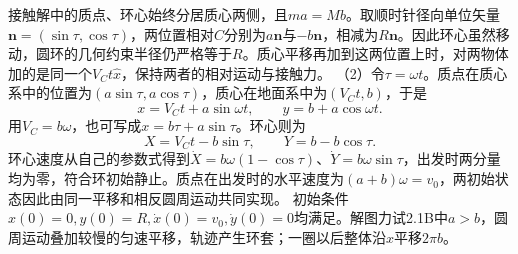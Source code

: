 \documentclass[UTF8,fontset=fandol,a4paper,11pt]{ctexart}
\begin{document}
接触解中的质点、环心始终分居质心两侧，且$ma=Mb$。取顺时针径向单位矢量$\boldsymbol n=(\sin\tau,\cos\tau)$，两位置相对$C$分别为$a\boldsymbol n$与$-b\boldsymbol n$，相减为$R\boldsymbol n$。因此环心虽然移动，圆环的几何约束半径仍严格等于$R$。质心平移再加到这两位置上时，对两物体加的是同一个$V_Ct\hat x$，保持两者的相对运动与接触力。
（2）令$\tau=\omega t$。质点在质心系中的位置为$(a\sin\tau,a\cos\tau)$，质心在地面系中为$(V_Ct,b)$，于是
\[
\boxed{x=V_Ct+a\sin\omega t,\qquad
y=b+a\cos\omega t}.
\]
用$V_C=b\omega$，也可写成$x=b\tau+a\sin\tau$。环心则为
\[
X=V_Ct-b\sin\tau,\qquad Y=b-b\cos\tau.
\]
环心速度从自己的参数式得到$\dot X=b\omega(1-\cos\tau)$、$\dot Y=b\omega\sin\tau$，出发时两分量均为零，符合环初始静止。质点在出发时的水平速度为$(a+b)\omega=v_0$，两初始状态因此由同一平移和相反圆周运动共同实现。
初始条件$x(0)=0,y(0)=R,\dot x(0)=v_0,\dot y(0)=0$均满足。解图力试2.1B中$a>b$，圆周运动叠加较慢的匀速平移，轨迹产生环套；一圈以后整体沿$x$平移$2\pi b$。
\end{document}
